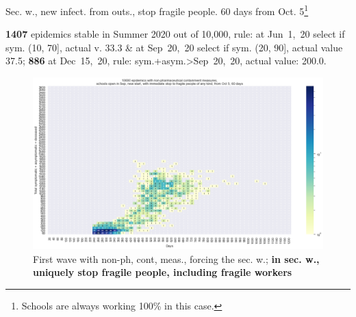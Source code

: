 \documentclass[8pt]{beamer}
\begin{document}
\begin{frame}{Sec. w., new infect. from outs., stop fragile people. 60  days from Oct. 5\footnote{Schools are always working 100\% in this case.}}


\textbf{1407} {\tiny epidemics stable in Summer 2020 out of 10,000, rule: at Jun~1,~20 select if sym. (10, 70], actual v. 33.3 \& at Sep~20,~20 select if sym. (20, 90], actual value 37.5;} \textbf{886} {\tiny at Dec~15,~20, rule: sym.+asym.>Sep~20,~20, actual value: 200.0.}

\begin{figure}[H]
\center
\includegraphics[scale=0.17]{10kForceWave2NoFragOct5for60d.png}
\caption{First wave with non-ph, cont, meas., forcing the sec. w.; \textbf{in sec. w., uniquely stop fragile people, including fragile workers}} 
\label{selForceWave2NoFrag}
\end{figure}



\end{frame}
\end{document}

